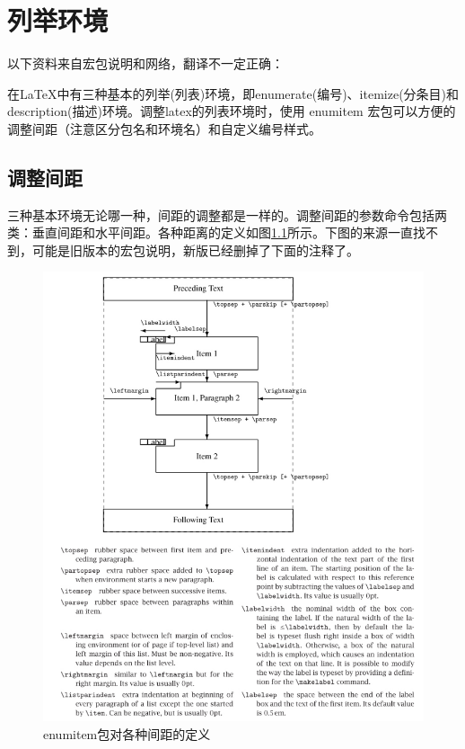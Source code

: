 \chapter{列举环境}
以下资料来自宏包说明和网络，翻译不一定正确：

在LaTeX中有三种基本的列举(列表)环境，即enumerate(编号)、itemize(分条目)和description(描述)环境。调整latex的列表环境时，使用 enumitem 宏包可以方便的调整间距（注意区分包名和环境名）和自定义编号样式。

\section{调整间距}
三种基本环境无论哪一种，间距的调整都是一样的。调整间距的参数命令包括两类：垂直间距和水平间距。各种距离的定义如图\ref{enumitem}所示。下图的来源一直找不到，可能是旧版本的宏包说明，新版已经删掉了下面的注释了。
\begin{figure}[htbp]
	\centering
	\includegraphics[scale=0.6]{Fig/enumitem1.png}
	\caption{\label{enumitem}enumitem包对各种间距的定义}
\end{figure}

